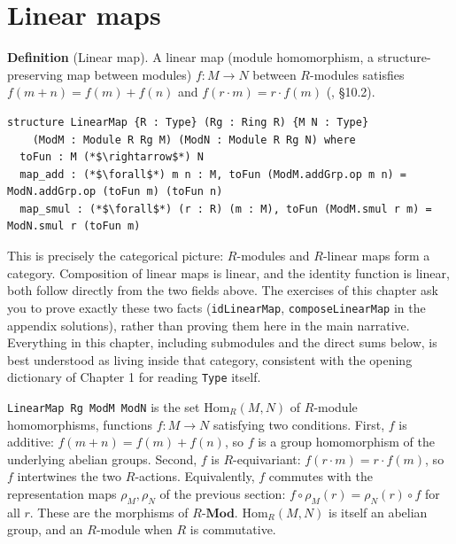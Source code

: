 \section{Linear maps}\label{sec:11-modules:05-linear-maps:1}

\textbf{Definition} (Linear map). A linear map (module homomorphism, a structure-preserving map between modules) \(f : M \to N\) between \(R\)-modules satisfies \(f(m+n) = f(m) + f(n)\) and \(f(r \cdot m) = r \cdot f(m)\) (\cite{DummitFoote2003}, §10.2).

\begin{lstlisting}
structure LinearMap {R : Type} (Rg : Ring R) {M N : Type}
    (ModM : Module R Rg M) (ModN : Module R Rg N) where
  toFun : M (*$\rightarrow$*) N
  map_add : (*$\forall$*) m n : M, toFun (ModM.addGrp.op m n) = ModN.addGrp.op (toFun m) (toFun n)
  map_smul : (*$\forall$*) (r : R) (m : M), toFun (ModM.smul r m) = ModN.smul r (toFun m)
\end{lstlisting}

This is precisely the categorical picture: \(R\)-modules and \(R\)-linear maps form a category. Composition of linear maps is linear, and the identity function is linear, both follow directly from the two fields above. The exercises of this chapter ask you to prove exactly these two facts (\texttt{idLinearMap}, \texttt{composeLinearMap} in the appendix solutions), rather than proving them here in the main narrative. Everything in this chapter, including submodules and the direct sums below, is best understood as living inside that category, consistent with the opening dictionary of Chapter 1 for reading \texttt{Type} itself.

\begin{mathreading}

\texttt{LinearMap Rg ModM ModN} is the set \(\mathrm{Hom}_R(M, N)\) of \(R\)-module homomorphisms, functions \(f : M \to N\) satisfying two conditions. First, \(f\) is additive: \(f(m+n) = f(m)+f(n)\), so \(f\) is a group homomorphism of the underlying abelian groups. Second, \(f\) is \(R\)-equivariant: \(f(r\cdot m) = r\cdot f(m)\), so \(f\) intertwines the two \(R\)-actions. Equivalently, \(f\) commutes with the representation maps \(\rho_M, \rho_N\) of the previous section: \(f\circ\rho_M(r) =
\rho_N(r)\circ f\) for all \(r\). These are the morphisms of \(R\text{-}\mathbf{Mod}\). \(\mathrm{Hom}_R(M,N)\) is itself an abelian group, and an \(R\)-module when \(R\) is commutative.

\end{mathreading}

